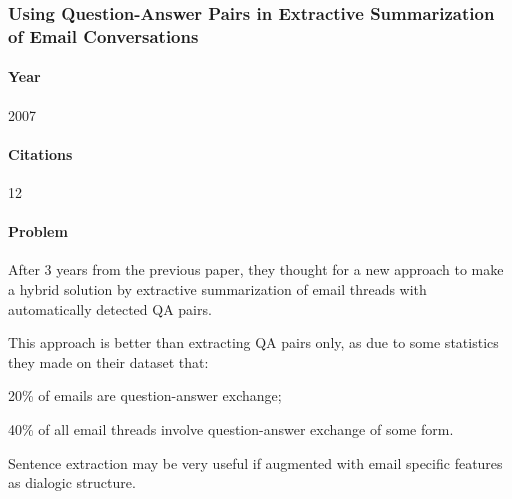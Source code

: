 
\subsubsection{Using Question-Answer Pairs in Extractive Summarization of Email Conversations \cite{KATHLEEN07}}

\paragraph{Year} 2007
\paragraph{Citations} 12

\paragraph{Problem}
\begin{my_itemize}
  \item After 3 years from the previous paper, they thought for a new approach 
	to make a hybrid solution by extractive summarization of email threads 
	with automatically detected QA pairs.
  \item This approach is better than extracting QA pairs only, as due to some 
	statistics they made on their dataset that:
  \begin{my_itemize}
    \item 20\% of emails are question-answer exchange;
    \item 40\% of all email threads involve question-answer exchange of some form.
  \end{my_itemize}
  \item Sentence extraction may be very useful if augmented with email specific 
	features as dialogic structure.
\end{my_itemize}

